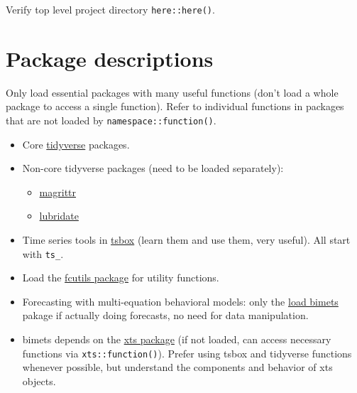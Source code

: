 \documentclass[
  letterpaper,
  DIV=11,
  numbers=noendperiod]{scrreport}
\providecommand{\tightlist}{%
  \setlength{\itemsep}{0pt}\setlength{\parskip}{0pt}}\usepackage{longtable,booktabs,array}
\begin{document}
Verify top level project directory \texttt{here::here()}.\\

\section{Package descriptions}\label{package-descriptions}

Only load essential packages with many useful functions (don't load a
whole package to access a single function). Refer to individual
functions in packages that are not loaded by
\texttt{namespace::function()}.\\

\begin{itemize}
\tightlist
\item
  Core \href{https://www.tidyverse.org}{tidyverse} packages.\\
\item
  Non-core tidyverse packages (need to be loaded separately):\\

  \begin{itemize}
  \tightlist
  \item
    \href{https://magrittr.tidyverse.org}{magrittr}\\
  \item
    \href{https://lubridate.tidyverse.org}{lubridate}
  \end{itemize}
\item
  Time series tools in \href{https://www.tsbox.help}{tsbox} (learn them
  and use them, very useful). All start with \texttt{ts\_}.\\
\item
  Load the \href{https://github.com/UHERO/fcutils}{fcutils package} for
  utility functions.\\
\item
  Forecasting with multi-equation behavioral models: only the
  \href{https://cran.r-project.org/web/packages/bimets/index.html}{load
  bimets} pakage if actually doing forecasts, no need for data
  manipulation.\\
\item
  bimets depends on the \href{http://joshuaulrich.github.io/xts/}{xts
  package} (if not loaded, can access necessary functions via
  \texttt{xts::function()}). Prefer using tsbox and tidyverse functions
  whenever possible, but understand the components and behavior of xts
  objects.\\
\end{itemize}
\end{document}

